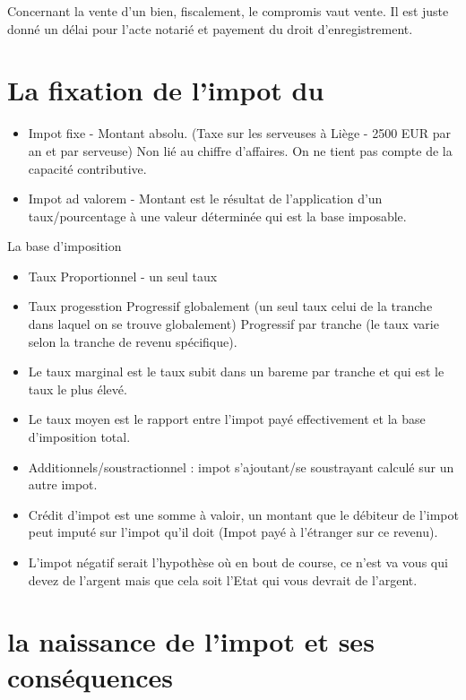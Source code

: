 \documentclass{book}
\begin{document}
Concernant la vente d'un bien, fiscalement, le compromis vaut vente. Il est juste donné un délai pour l'acte notarié et payement du droit d'enregistrement.

\section{La fixation de l'impot du}

\begin{itemize}
\item Impot fixe - Montant absolu. (Taxe sur les serveuses à Liège - 2500 EUR par an et par serveuse) Non lié au chiffre d'affaires. On ne tient pas compte de la capacité contributive.
\item Impot ad valorem - Montant est le résultat de l'application d'un taux/pourcentage à une valeur déterminée qui est la base imposable. 
\end{itemize}

La base d'imposition

\begin{itemize}
\item Taux Proportionnel - un seul taux
\item Taux progesstion
\iitem Progressif globalement (un seul taux celui de la tranche dans laquel on se trouve globalement) 
\iitem Progressif par tranche (le taux varie selon la tranche de revenu spécifique).
\item Le taux marginal est le taux subit dans un bareme par tranche et qui est le taux le plus élevé.
\item Le taux moyen est le rapport entre l'impot payé effectivement et la base d'imposition total.
\item Additionnels/soustractionnel : impot s'ajoutant/se soustrayant calculé sur un autre impot.
\item Crédit d'impot est une somme à valoir, un montant que le débiteur de l'impot peut imputé sur l'impot qu'il doit (Impot payé à l'étranger sur ce revenu).
\item L'impot négatif serait l'hypothèse où en bout de course, ce n'est va vous qui devez de l'argent mais que cela soit l'Etat qui vous devrait de l'argent.
\end{itemize}


\section{la naissance de l'impot et ses conséquences}
\end{document}
